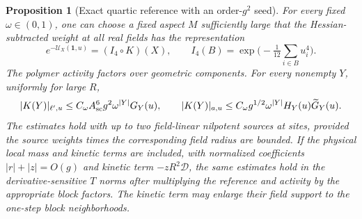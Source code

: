 \documentclass[11pt]{article}
\newtheorem{proposition}{Proposition}[section]
\begin{document}
\begin{proposition}[Exact quartic reference with an order-\(g^2\) seed]
\label{prop:transformed-init}
For every fixed \(\omega\in(0,1)\), one can choose a fixed aspect
\(M\) sufficiently large that the Hessian-subtracted weight at
all real fields has the representation
\[
 e^{-\mathcal U_X(\boldsymbol 1,u)}=(I_4\circ K)(X),
 \qquad I_4(B)=\exp\bigl(-\tfrac1{12}\sum_{i\in B}u_i^4\bigr).
\]
The polymer activity factors over geometric components. For every
nonempty \(Y\), uniformly for large \(R\),
\[
 |K(Y)|_{\ell',u}\le C_\omega A_{\rm sc}^6g^2\omega^{|Y|}G_Y(u),\qquad
 |K(Y)|_{a,u}\le C_\omega g^{1/2}\omega^{|Y|}H_Y(u)\widetilde G_Y(u).
\]
The estimates hold with up to two field-linear nilpotent sources
at sites, provided the source weights times the corresponding
field radius are bounded. If the physical local mass and kinetic
terms are included, with normalized coefficients \(|r|+|z|=O(g)\)
and kinetic term \(-zR^2\mathcal D\), the same estimates hold in
the derivative-sensitive \(T\) norms after multiplying the
reference and activity by the appropriate block factors. The
kinetic term may enlarge their field support to the one-step
block neighborhoods.
\end{proposition}
\end{document}
